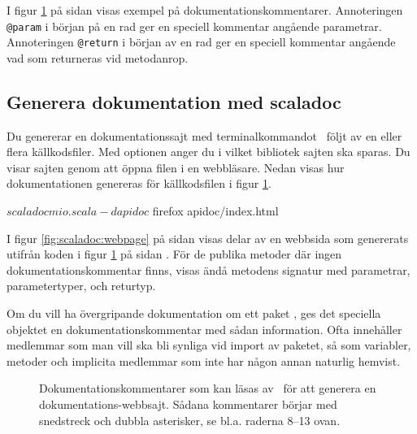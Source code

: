 I figur \ref{fig:scaladoc:mio} på sidan \pageref{fig:scaladoc:mio} visas exempel på dokumentationskommentarer. Annoteringen \verb|@param| i början på en rad ger en speciell kommentar angående parametrar. Annoteringen \verb|@return| i början av en rad ger en speciell kommentar angående vad som returneras vid metodanrop.


\subsection{Generera dokumentation med scaladoc}


Du genererar en dokumentationssajt med terminalkommandot \scaladoc\ följt av en eller flera källkodsfiler. Med optionen  anger du i vilket bibliotek sajten ska sparas. Du visar sajten genom att öppna filen  i en webbläsare. Nedan visas hur dokumentationen genereras för källkodsfilen i figur \ref{fig:scaladoc:mio}.
\begin{REPLnonum}
$ scaladoc mio.scala -d apidoc
$ firefox apidoc/index.html
\end{REPLnonum}

I figur \ref{fig:scaladoc:webpage} på sidan \pageref{fig:scaladoc:webpage} visas delar av en webbsida som genererats utifrån koden i figur \ref{fig:scaladoc:mio} på sidan \pageref{fig:scaladoc:mio}. För de publika metoder där ingen dokumentationskommentar finns, visas ändå metodens signatur med parametrar, parametertyper, och returtyp. %


Om du vill ha övergripande dokumentation om ett paket , ges det speciella objektet  en dokumentationskommentar med sådan information. Ofta innehåller  medlemmar som man vill ska bli synliga vid import av paketet, så som variabler, metoder och implicita medlemmar som inte har någon annan naturlig hemvist.

\begin{figure}[b]
    \caption{Dokumentationskommentarer som kan läsas av \scaladoc\ för att generera en dokumentations-webbsajt. Sådana kommentarer börjar  med snedstreck och dubbla asterisker, se bl.a. raderna 8--13 ovan.}
    \label{fig:scaladoc:mio}
\end{figure}

